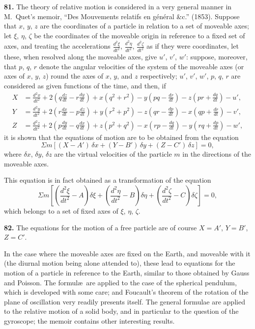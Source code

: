 \documentclass[11pt,a4paper]{article}
\theoremstyle{definition}
\begin{document}
\textbf{81.} The theory of relative motion is considered in a very general manner in M.~Quet's memoir, ``Des Mouvements relatifs en g\'en\'eral \&c.'' (1853). Suppose that $x$, $y$, $z$ are the coordinates of a particle in relation to a set of moveable axes; let $\xi$, $\eta$, $\zeta$ be the coordinates of the moveable origin in reference to a fixed set of axes, and treating the accelerations $\frac{d^2\xi}{dt^2}$, $\frac{d^2\eta}{dt^2}$, $\frac{d^2\zeta}{dt^2}$ as if they were coordinates, let these, when resolved along the moveable axes, give $u'$, $v'$, $w'$: suppose, moreover, that $p$, $q$, $r$ denote the angular velocities of the system of the moveable axes (or axes of $x$, $y$, $z$) round the axes of $x$, $y$, and $z$ respectively; $u'$, $v'$, $w'$, $p$, $q$, $r$ are considered as given functions of the time, and then, if
\begin{align*}
X &= \frac{d^2x}{dt^2} + 2\left(q\frac{dz}{dt} - r\frac{dy}{dt}\right) + x(q^2 + r^2) - y\left(pq - \frac{dr}{dt}\right) - z\left(pr + \frac{dq}{dt}\right) - u', \\
Y &= \frac{d^2y}{dt^2} + 2\left(r\frac{dx}{dt} - p\frac{dz}{dt}\right) + y(r^2 + p^2) - z\left(qr - \frac{dp}{dt}\right) - x\left(qp + \frac{dr}{dt}\right) - v', \\
Z &= \frac{d^2z}{dt^2} + 2\left(p\frac{dy}{dt} - q\frac{dx}{dt}\right) + z(p^2 + q^2) - x\left(rp - \frac{dq}{dt}\right) - y\left(rq + \frac{dp}{dt}\right) - w',
\end{align*}
it is shown that the equations of motion are to be obtained from the equation
\[
\Sigma m \left[(X - A')\,\delta x + (Y - B')\,\delta y + (Z - C')\,\delta z\right] = 0,
\]
where $\delta x$, $\delta y$, $\delta z$ are the virtual velocities of the particle $m$ in the directions of the moveable axes.

This equation is in fact obtained as a transformation of the equation
\[
\Sigma m \left[\left(\frac{d^2\xi}{dt^2} - A\right)\delta\xi + \left(\frac{d^2\eta}{dt^2} - B\right)\delta\eta + \left(\frac{d^2\zeta}{dt^2} - C\right)\delta\zeta\right] = 0,
\]
which belongs to a set of fixed axes of $\xi$, $\eta$, $\zeta$.

\textbf{82.} The equations for the motion of a free particle are of course $X = A'$, $Y = B'$, $Z = C'$.

In the case where the moveable axes are fixed on the Earth, and moveable with it (the diurnal motion being alone attended to), these lead to equations for the motion of a particle in reference to the Earth, similar to those obtained by Gauss and Poisson. The formul\ae\ are applied to the case of the spherical pendulum, which is developed with some care; and Foucault's theorem of the rotation of the plane of oscillation very readily presents itself. The general formulae are applied to the relative motion of a solid body, and in particular to the question of the gyroscope; the memoir contains other interesting results.
\end{document}
